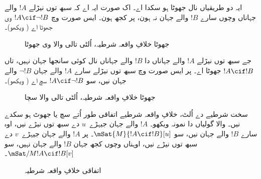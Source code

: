 \documentclass[../../../include/open-logic-section]{subfiles}
\begin{document}
ایہ دو طریقیاں نال جھوٹا ہو سکدا اے۔ اک صورت ایہ اے کہ سبھ توں نیڑلے
$!A$ والے جہاناں وچوں سارے $!B$ والے جہان نہ ہون، پر کجھ ہون۔ ایس صورت
وچ $!A \cif \lnot !B$ وی جھوٹا اے ( ویکھو)۔
\begin{figure}
\begin{center}
\caption{جھوٹا خلافِ واقعہ شرطیہ، اُلٹی تالی والا وی جھوٹا}
\end{center}
\end{figure}
جے سبھ توں نیڑلے $!A$ والے جہاناں دا $!B$ والے جہاناں نال کوئی سانجھا
جہان نہیں، تاں $!A \cif !B$ جھوٹا اے۔ پر ایس صورت وچ سبھ توں نیڑلے
سارے $!A$ والے جہان $\lnot !B$ والے جہان نیں، سو $!A \cif \lnot !B$ سچ
اے ( ویکھو)۔
\begin{figure}
\begin{center}
\caption{جھوٹا خلافِ واقعہ شرطیہ، اُلٹی تالی والا سچا}
\end{center}
\end{figure}

سخت شرطیے دے اُلٹ، خلافِ واقعہ شرطیے اتفاقی طور اُتے سچ یا جھوٹ ہو
سکدے نیں۔  والا گولیاں دا نمونہ ویکھو۔
$!A$ والے جہان جیہڑے~$u$ دے سبھ توں نیڑے نیں، اوہ سارے $!B$ والے جہان نیں، سو
$\mSat{M}{!A \cif !B}[u]$۔ پر $!A$ والے جہان جیہڑے~$v$ دے سبھ توں نیڑے نیں، اوہناں وچوں کجھ جہان
$!B$ والے جہان نہیں، سو $\mSat/{M}{!A \cif !B}[v]$۔
\begin{figure}
\begin{center}
\end{center}
\caption{اتفاقی خلافِ واقعہ شرطیہ}
\end{figure}
\end{document}
